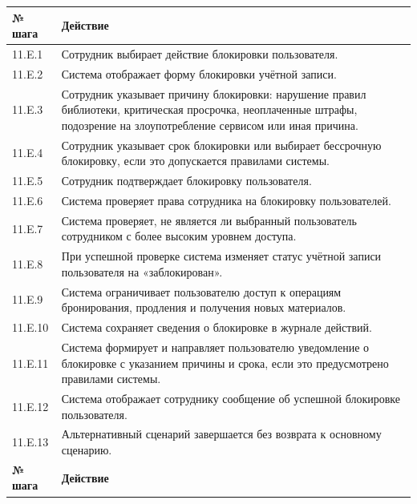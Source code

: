 \documentclass[12pt,a4paper]{article}
\begin{document}
\begin{xltabular}{\textwidth}{
			|>{\raggedright\arraybackslash}p{2.7cm}
			|>{\raggedright\arraybackslash}X|
		}
		
		\textbf{№ шага} & \textbf{Действие} \\
		\hline
		
		11.E.1 & Сотрудник выбирает действие блокировки пользователя. \\
		\hline
		11.E.2 & Система отображает форму блокировки учётной записи. \\
		\hline
		11.E.3 & Сотрудник указывает причину блокировки: нарушение правил
		библиотеки, критическая просрочка, неоплаченные штрафы, подозрение
		на злоупотребление сервисом или иная причина. \\
		\hline
		11.E.4 & Сотрудник указывает срок блокировки или выбирает бессрочную
		блокировку, если это допускается правилами системы. \\
		\hline
		11.E.5 & Сотрудник подтверждает блокировку пользователя. \\
		\hline
		11.E.6 & Система проверяет права сотрудника на блокировку пользователей. \\
		\hline
		11.E.7 & Система проверяет, не является ли выбранный пользователь
		сотрудником с более высоким уровнем доступа. \\
		\hline
		11.E.8 & При успешной проверке система изменяет статус учётной записи
		пользователя на «заблокирован». \\
		\hline
		11.E.9 & Система ограничивает пользователю доступ к операциям бронирования,
		продления и получения новых материалов. \\
		\hline
		11.E.10 & Система сохраняет сведения о блокировке в журнале действий. \\
		\hline
		11.E.11 & Система формирует и направляет пользователю уведомление о
		блокировке с указанием причины и срока, если это предусмотрено
		правилами системы. \\
		\hline
		11.E.12 & Система отображает сотруднику сообщение об успешной блокировке
		пользователя. \\
		\hline
		11.E.13 & Альтернативный сценарий завершается без возврата к основному
		сценарию. \\
		\hline
		
		
		\textbf{№ шага} & \textbf{Действие} \\
		\hline
		

\end{xltabular}
\end{document}
